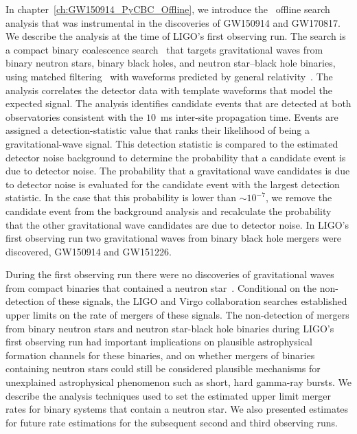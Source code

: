 In chapter~\ref{ch:GW150914_PyCBC_Offline}, we introduce the \pycbc{}\ offline search analysis that was instrumental in the discoveries of GW150914 and GW170817. We describe the analysis at the time of LIGO's first observing run. The \pycbc{} search is a compact binary coalescence search~\cite{thorne.k:1987,Sathyaprakash:1991mt,Cutler:1992tc,Finn:1992wt,Finn:1992xs,Dhurandhar:1992mw,Balasubramanian:1995bm,Flanagan:1997sx} that targets gravitational waves from binary neutron stars, binary black holes, and neutron star--black hole binaries, using matched filtering~\cite{wainstein:1962} with waveforms predicted by general relativity~\cite{Peters:1963ux,Blanchet2006,Buonanno:1998gg,Buonanno:2000ef,Damour:2000we,Damour:2001tu,Ajith:2007qp,Ajith:2009bn,Santamaria:2010yb}.  The \pycbc{} analysis correlates the detector data with template waveforms that model the expected signal. The analysis identifies candidate events that are detected at both observatories consistent with the $10$~ms inter-site propagation time. Events are assigned a detection-statistic value that ranks their likelihood of being a gravitational-wave signal. This detection statistic is compared to the estimated detector noise background to determine the probability that a candidate event is due to detector noise. The probability that a gravitational wave candidates is due to detector noise is evaluated for the candidate event with the largest detection statistic. In the case that this probability is lower than $\sim 10^{-7}$, we remove the candidate event from the background analysis and recalculate the probability that the other gravitational wave candidates are due to detector noise. In LIGO's first observing run two gravitational waves from binary black hole mergers were discovered, GW150914 and GW151226.

During the first observing run there were no discoveries of gravitational waves from compact binaries that contained a neutron star~\cite{O1BBH}. Conditional on the non-detection of these signals, the LIGO and Virgo collaboration searches established upper limits on the rate of mergers of these signals. The non-detection of mergers from binary neutron stars and neutron star-black hole binaries during LIGO's first observing run had important implications on plausible astrophysical formation channels for these binaries, and on whether mergers of binaries containing neutron stars could still be considered plausible mechanisms for unexplained astrophysical phenomenon such as short, hard gamma-ray bursts. We describe the analysis techniques used to set the estimated upper limit merger rates for binary systems that contain a neutron star. We also presented estimates for future rate estimations for the subsequent second and third observing runs.

